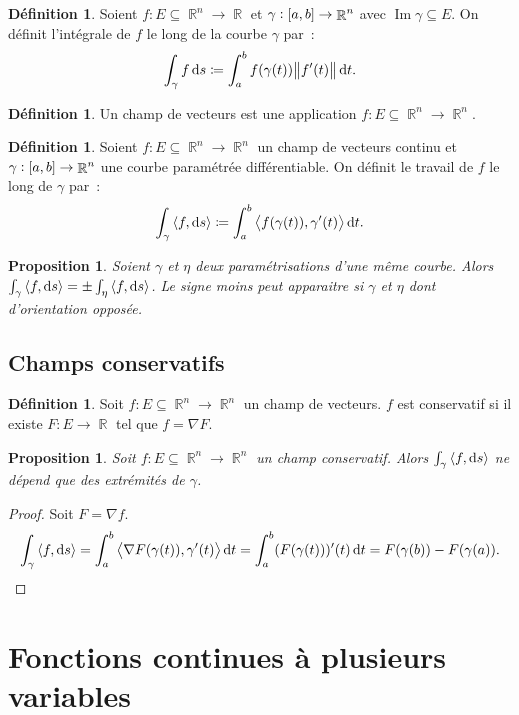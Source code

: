 \documentclass{article}
\DeclareMathOperator{\Imf}{Im}
\DeclareMathOperator{\R}{\mathbb R}
\newcommand{\scpr}[2]{{\left\langle#1, #2\right\rangle}}
\newcommand{\ab}{\interval ab}
\newtheorem{prp}[thm]{Proposition}
\theoremstyle{definition}
\newtheorem{déf}[thm]{Définition}
\theoremstyle{remark}
\begin{document}
		\begin{déf} Soient $f : E \subseteq \R^n \to \R$ et $\gamma : \ab \to \R^n$ avec $\Imf \gamma \subseteq E$. On définit l'intégrale de $f$ le
		long de la courbe $\gamma$ par~:
		\[\int_\gamma f\dif s \coloneqq \int_a^bf(\gamma(t))\norm{f'(t)}\dif t.\]
		\end{déf}

		\begin{déf} Un champ de vecteurs est une application $f : E \subseteq \R^n \to \R^n$. \end{déf}

		\begin{déf} Soient $f : E \subseteq \R^n \to \R^n$ un champ de vecteurs continu et $\gamma : \ab \to \R^n$ une courbe paramétrée différentiable.
		On définit le travail de $f$ le long de $\gamma$ par~:
		\[\int_\gamma\scpr f{\dif s} \coloneqq \int_a^b\scpr {f(\gamma(t))}{\gamma'(t)}\dif t.\]
		\end{déf}

		\begin{prp} Soient $\gamma$ et $\eta$ deux paramétrisations d'une même courbe. Alors $\int_\gamma\scpr f{\dif s} = \pm\int_\eta\scpr f{\dif s}$.
		Le signe moins peut apparaitre si $\gamma$ et $\eta$ dont d'orientation opposée. \end{prp}

	\subsection{Champs conservatifs}
		
		\begin{déf} Soit $f : E \subseteq \R^n \to \R^n$ un champ de vecteurs. $f$ est conservatif si il existe $F : E \to \R$ tel que $f = \nabla F$.
		\end{déf}

		\begin{prp} Soit $f : E \subseteq \R^n \to \R^n$ un champ conservatif. Alors $\int_\gamma\scpr f{\dif s}$ ne dépend que des extrémités de
		$\gamma$. \end{prp}

		\begin{proof} Soit $F = \nabla f$.
		\[\int_\gamma\scpr f{\dif s} = \int_a^b\scpr {\nabla F(\gamma(t))}{\gamma'(t)}\dif t = \int_a^b(F(\gamma(t)))'(t)\dif t = F(\gamma(b))-F(\gamma(a)).\]
		\end{proof}

\newpage
\section{Fonctions continues à plusieurs variables}
\end{document}
